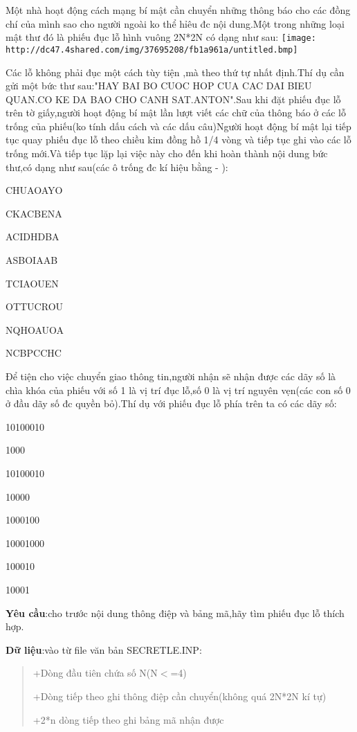 

Một nhà hoạt động cách mạng bí mật cần chuyển những thông báo cho các đồng chí của mình sao cho người ngoài ko thể hỉêu đc nội dung.Một trong những loại mật thư đó là phiếu đục lỗ hình vuông 2N*2N có dạng như sau:
\texttt{[image: http://dc47.4shared.com/img/37695208/fb1a961a/untitled.bmp]}

Các lỗ không phải đục một cách tùy tiện ,mà theo thứ tự nhất định.Thí dụ cần gửi một bức thư sau:"HAY BAI BO CUOC HOP CUA CAC DAI BIEU QUAN.CO KE DA BAO CHO CANH SAT.ANTON".Sau khi đặt phiếu đục lỗ trên tờ giấy,người hoạt động bí mật lần lượt viết các chữ của thông báo ở các lỗ trống của phiếu(ko tính dấu cách và các dấu câu)Người hoạt động bí mật lại tiếp tục quay phiếu đục lỗ theo chiều kim đồng hồ 1/4 vòng và tiếp tục ghi vào các lỗ trống mới.Và tiếp tục lặp lại việc này cho đến khi hoàn thành nội dung bức thư,có dạng như sau(các ô trống đc kí hiệu bằng - ):

CHUAOAYO

CKACBENA

ACIDHDBA

ASBOIAAB

TCIAOUEN

OTTUCROU

NQHOAUOA

NCBPCCHC

Để tiện cho việc chuyển giao thông tin,người nhận sẽ nhận được các dãy số là chìa khóa của phiếu với số 1 là vị trí đục lỗ,số 0 là vị trí nguyên vẹn(các con số 0 ở đầu dãy số đc quyền bỏ).Thí dụ với phiếu đục lỗ phía trên ta có các dãy số:

10100010

1000

10100010

10000

1000100

10001000

100010

10001

\textbf{Yêu cầu}:cho trước nội dung thông điệp và bảng mã,hãy tìm phiếu đục lỗ thích hợp.

\textbf{Dữ liệu}:vào từ file văn bản SECRETLE.INP:
\begin{quotation}

+Dòng đầu tiên chứa số N(N$<$=4)

+Dòng tiếp theo ghi thông điệp cần chuyển(không quá 2N*2N kí tự)

+2*n dòng tiếp theo ghi bảng mã nhận được
\end{quotation}

